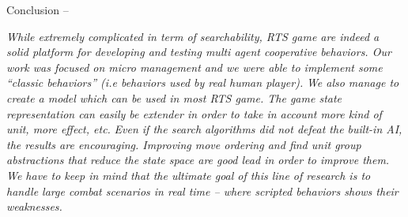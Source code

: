 \begin{bfseries} Conclusion -- \end{bfseries}
    \emph{While extremely complicated in term of searchability, RTS game are indeed a solid platform for developing and testing multi agent cooperative behaviors. Our work was focused on micro management and we were able to implement some ``classic behaviors'' (\emph{i.e} behaviors used by real human player).} 
    \emph{We also manage to create a model which can be used in most RTS game. The game state representation can easily be extender in order to take in account more kind of unit, more effect, etc.} 
\emph{Even if the search algorithms did not defeat the built-in AI, the results are encouraging. Improving move ordering and find unit group abstractions that reduce the state space are good lead in order to improve them.}
\emph{We have to keep in mind that the ultimate goal of this line of research is to handle large combat scenarios in real time -- where scripted behaviors shows their weaknesses.}
